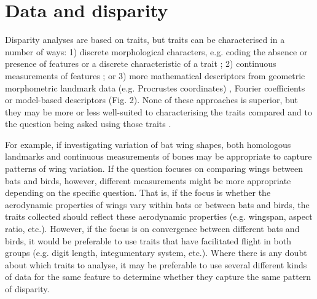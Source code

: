 \documentclass[12pt,letterpaper]{article}
\begin{document}



\section{Data and disparity} \label{section:data}


\noindent Disparity analyses are based on traits, but traits can be characterised in a number of ways:
1) discrete morphological characters, e.g. coding the absence or presence of features or a discrete characteristic of a trait \citep[e.g.][]{Foote1989, Deline2018};
2) continuous measurements of features \citep[e.g. lengths in][]{Friedman2010};
or 3) more mathematical descriptors from geometric morphometric landmark data (e.g.
Procrustes coordinates)  \citep[e.g.][]{sherratt2017rates}, Fourier coefficients \citep[e.g.][]{Foote1995, Spriggs2018} or model-based descriptors \citep[e.g.][]{Raup1961,Saunders2004} (Fig. 2).
None of these approaches is superior, but they may be more or less well-suited to characterising the traits compared and to the question being asked using those traits \citep{hetherington2015cladistic,Hopkins2017}.

For example, if investigating variation of bat wing shapes, both homologous landmarks and continuous measurements of bones may be appropriate to capture patterns of wing variation.
If the question focuses on comparing wings between bats and birds, however, different measurements might be more appropriate depending on the specific question.
That is, if the focus is whether the aerodynamic properties of wings vary within bats or between bats and birds, the traits collected should reflect these aerodynamic properties (e.g. wingspan, aspect ratio, etc.).
However, if the focus is on convergence between different bats and birds, it would be preferable to use traits that have facilitated flight in both groups (e.g.
digit length, integumentary system, etc.).
Where there is any doubt about which traits to analyse, it may be preferable to use several different kinds of data for the same feature to determine whether they capture the same pattern of disparity.
\end{document}
